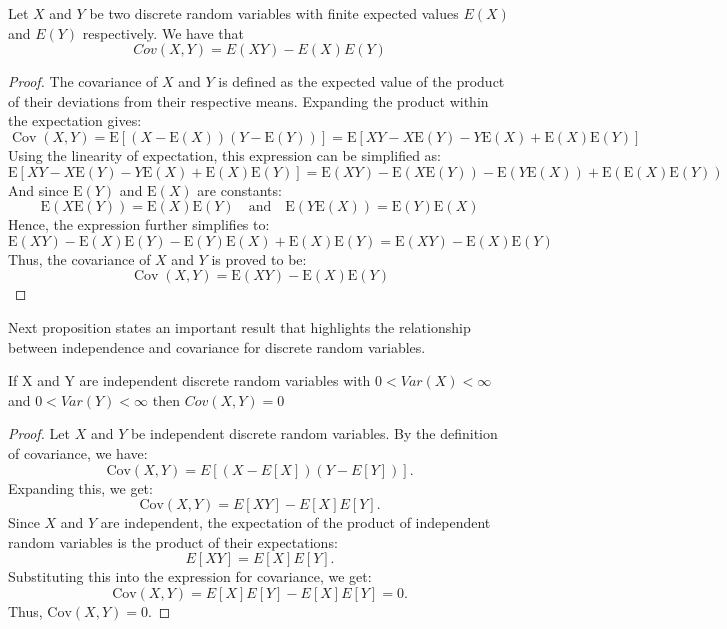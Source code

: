 \begin{proposition}
Let $X$ and $Y$ be two discrete random variables with finite expected values $E(X)$ and $E(Y)$ respectively. We have that
\[
Cov\left(X,Y\right)=E\left(XY\right)-E\left(X\right)E\left(Y\right)
\]
\end{proposition}
\begin{proof}
The covariance of \(X\) and \(Y\) is defined as the expected value of the product of their deviations from their respective means. Expanding the product within the expectation gives:
\[
\operatorname{Cov}(X, Y) = \mathrm{E}[(X - \mathrm{E}(X))(Y - \mathrm{E}(Y))] = \mathrm{E}[XY - X\mathrm{E}(Y) - Y\mathrm{E}(X) + \mathrm{E}(X)\mathrm{E}(Y)]
\]
Using the linearity of expectation, this expression can be simplified as:
\[
\mathrm{E}[XY - X\mathrm{E}(Y) - Y\mathrm{E}(X) + \mathrm{E}(X)\mathrm{E}(Y)] = \mathrm{E}(XY) - \mathrm{E}(X\mathrm{E}(Y)) - \mathrm{E}(Y\mathrm{E}(X)) + \mathrm{E}(\mathrm{E}(X)\mathrm{E}(Y))
\]
And since \(\mathrm{E}(Y)\) and \(\mathrm{E}(X)\) are constants:
\[
\mathrm{E}(X\mathrm{E}(Y)) = \mathrm{E}(X)\mathrm{E}(Y) \quad \text{and} \quad \mathrm{E}(Y\mathrm{E}(X)) = \mathrm{E}(Y)\mathrm{E}(X)
\]
Hence, the expression further simplifies to:
\[
\mathrm{E}(XY) - \mathrm{E}(X)\mathrm{E}(Y) - \mathrm{E}(Y)\mathrm{E}(X) + \mathrm{E}(X)\mathrm{E}(Y) = \mathrm{E}(XY) - \mathrm{E}(X)\mathrm{E}(Y)
\]
Thus, the covariance of \(X\) and \(Y\) is proved to be:
\[
\operatorname{Cov}(X, Y) = \mathrm{E}(XY) - \mathrm{E}(X)\mathrm{E}(Y)
\]
\end{proof}

Next proposition states an important result that highlights the relationship between independence and covariance for discrete random variables.

\begin{proposition}
If X and Y are independent discrete random variables with $0<Var(X)<\infty$ and $0<Var(Y)<\infty$ then $Cov\left(X,Y\right)=0$
\end{proposition}
\begin{proof}
Let \( X \) and \( Y \) be independent discrete random variables. By the definition of covariance, we have:
\[
\text{Cov}(X, Y) = E\left[ (X - E[X])(Y - E[Y]) \right].
\]
Expanding this, we get:
\[
\text{Cov}(X, Y) = E[XY] - E[X]E[Y].
\]
Since \( X \) and \( Y \) are independent, the expectation of the product of independent random variables is the product of their expectations:
\[
E[XY] = E[X]E[Y].
\]
Substituting this into the expression for covariance, we get:
\[
\text{Cov}(X, Y) = E[X]E[Y] - E[X]E[Y] = 0.
\]
Thus, \( \text{Cov}(X, Y) = 0 \).
\end{proof}

